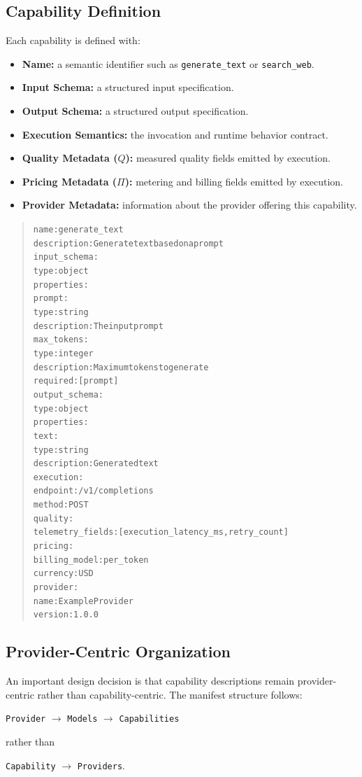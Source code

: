 \subsection{Capability Definition}

Each capability is defined with:
\begin{itemize}[leftmargin=*,nosep]
  \item \textbf{Name:} a semantic identifier such as \texttt{generate\_text} or \texttt{search\_web}.
  \item \textbf{Input Schema:} a structured input specification.
  \item \textbf{Output Schema:} a structured output specification.
  \item \textbf{Execution Semantics:} the invocation and runtime behavior contract.
  \item \textbf{Quality Metadata ($Q$):} measured quality fields emitted by execution.
  \item \textbf{Pricing Metadata ($\Pi$):} metering and billing fields emitted by execution.
  \item \textbf{Provider Metadata:} information about the provider offering this capability.
\end{itemize}

\begin{quote}
\small
\begin{alltt}
name: generate\_text
description: Generate text based on a prompt
input\_schema:
  type: object
  properties:
    prompt:
      type: string
      description: The input prompt
    max\_tokens:
      type: integer
      description: Maximum tokens to generate
  required: [prompt]
output\_schema:
  type: object
  properties:
    text:
      type: string
      description: Generated text
execution:
  endpoint: /v1/completions
  method: POST
quality:
  telemetry\_fields: [execution\_latency\_ms, retry\_count]
pricing:
  billing\_model: per\_token
  currency: USD
provider:
  name: Example Provider
  version: 1.0.0
\end{alltt}
\end{quote}

\subsection{Provider-Centric Organization}

An important design decision is that capability descriptions remain provider-centric rather than capability-centric. The manifest structure follows:
\begin{center}
\texttt{Provider} $\rightarrow$ \texttt{Models} $\rightarrow$ \texttt{Capabilities}
\end{center}
rather than
\begin{center}
\texttt{Capability} $\rightarrow$ \texttt{Providers}.
\end{center}

